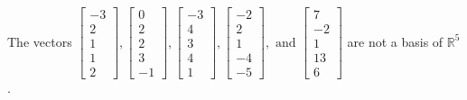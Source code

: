 \begin{exercise}
\begin{exerciseStatement}
  \end{exerciseStatement}
  \begin{exerciseAnswer}
   The vectors \(\left[\begin{array}{r}
-3 \\
2 \\
1 \\
1 \\
2
\end{array}\right] , \left[\begin{array}{r}
0 \\
2 \\
2 \\
3 \\
-1
\end{array}\right] , \left[\begin{array}{r}
-3 \\
4 \\
3 \\
4 \\
1
\end{array}\right] , \left[\begin{array}{r}
-2 \\
2 \\
1 \\
-4 \\
-5
\end{array}\right] , \text{ and } \left[\begin{array}{r}
7 \\
-2 \\
1 \\
13 \\
6
\end{array}\right]\) 
  	 are not  a basis of \(\mathbb{R}^5\).
  


  \end{exerciseAnswer}
\end{exercise}